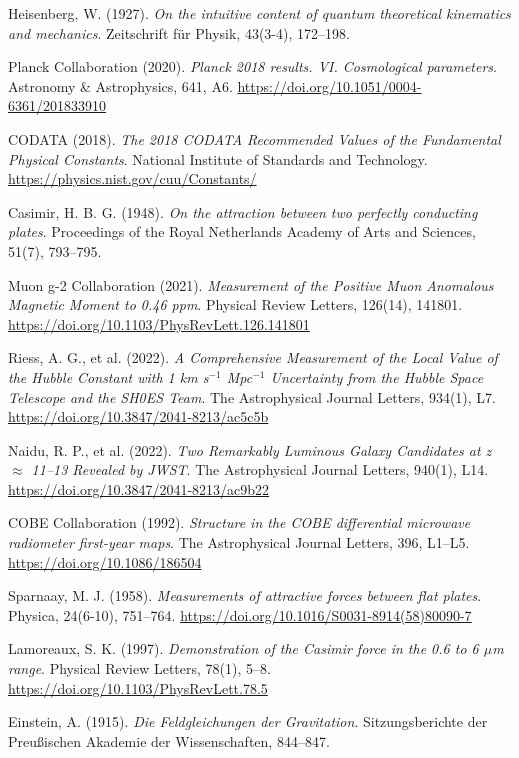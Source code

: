 \documentclass[12pt,a4paper]{article}
\begin{document}
\begin{thebibliography}{20}
		Heisenberg, W. (1927). 
		\textit{On the intuitive content of quantum theoretical kinematics and mechanics}. 
		Zeitschrift f\"ur Physik, 43(3-4), 172--198.
		
		Planck Collaboration (2020). 
		\textit{Planck 2018 results. VI. Cosmological parameters}. 
		Astronomy \& Astrophysics, 641, A6. 
		\url{https://doi.org/10.1051/0004-6361/201833910}
		
		CODATA (2018). 
		\textit{The 2018 CODATA Recommended Values of the Fundamental Physical Constants}. 
		National Institute of Standards and Technology. 
		\url{https://physics.nist.gov/cuu/Constants/}
		
		Casimir, H. B. G. (1948). 
		\textit{On the attraction between two perfectly conducting plates}. 
		Proceedings of the Royal Netherlands Academy of Arts and Sciences, 51(7), 793--795.
		
		Muon g-2 Collaboration (2021). 
		\textit{Measurement of the Positive Muon Anomalous Magnetic Moment to 0.46 ppm}. 
		Physical Review Letters, 126(14), 141801. 
		\url{https://doi.org/10.1103/PhysRevLett.126.141801}
		
		Riess, A. G., et al. (2022). 
		\textit{A Comprehensive Measurement of the Local Value of the Hubble Constant with 1 km s$^{-1}$ Mpc$^{-1}$ Uncertainty from the Hubble Space Telescope and the SH0ES Team}. 
		The Astrophysical Journal Letters, 934(1), L7. 
		\url{https://doi.org/10.3847/2041-8213/ac5c5b}
		
		Naidu, R. P., et al. (2022). 
		\textit{Two Remarkably Luminous Galaxy Candidates at z $\approx$ 11--13 Revealed by JWST}. 
		The Astrophysical Journal Letters, 940(1), L14. 
		\url{https://doi.org/10.3847/2041-8213/ac9b22}
		
		COBE Collaboration (1992). 
		\textit{Structure in the COBE differential microwave radiometer first-year maps}. 
		The Astrophysical Journal Letters, 396, L1--L5. 
		\url{https://doi.org/10.1086/186504}
		
		Sparnaay, M. J. (1958). 
		\textit{Measurements of attractive forces between flat plates}. 
		Physica, 24(6-10), 751--764. 
		\url{https://doi.org/10.1016/S0031-8914(58)80090-7}
		
		Lamoreaux, S. K. (1997). 
		\textit{Demonstration of the Casimir force in the 0.6 to 6 $\mu$m range}. 
		Physical Review Letters, 78(1), 5--8. 
		\url{https://doi.org/10.1103/PhysRevLett.78.5}
		
		Einstein, A. (1915). 
		\textit{Die Feldgleichungen der Gravitation}. 
		Sitzungsberichte der Preußischen Akademie der Wissenschaften, 844--847.
		
	\end{thebibliography}
	
\end{document}

